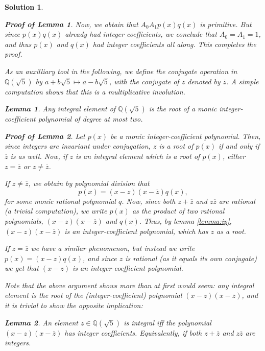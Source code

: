 \documentclass{article}
\newtheorem{lemma}{Lemma}
\theoremstyle{nonumberplain}
\newtheorem{sol}{Solution}
\newtheorem{lemmaproof}{Proof of Lemma}
\newcommand{\Q}{\mathbb{Q}}
\newcommand{\conj}[1]{\overline{#1}}
\begin{document}
\begin{sol}
\begin{lemmaproof}
Now, we obtain that $A_0 A_1 p(x) q(x)$ is primitive. But since $p(x) q(x)$ already had integer coefficients, we conclude that $A_0 = A_1 = 1$, and thus $p(x)$ and $q(x)$ had integer coefficients all along. This completes the proof.
\end{lemmaproof}

As an auxilliary tool in the following, we define the conjugate operation in $\Q(\sqrt5)$ by $a+b\sqrt5 \mapsto a-b\sqrt5$, with the conjugate of $z$ denoted by $\conj z$. A simple computation shows that this is a multiplicative involution.

\begin{lemma}
Any integral element of $\Q(\sqrt5)$ is the root of a monic integer-coefficient polynomial of degree at most two.
\end{lemma}

\begin{lemmaproof}
Let $p(x)$ be a monic integer-coefficient polynomial. Then, since integers are invariant under conjugation, $z$ is a root of $p(x)$ if and only if $\conj z$ is as well. Now, if $z$ is an integral element which is a root of $p(x)$, either $z = \conj z$ or $z \neq \conj z$.

If $z \neq \conj z$, we obtain by polynomial division that
\begin{equation}
p(x) = (x-z)(x-\conj z) q(x),
\end{equation}
for some monic rational polynomial $q$. Now, since both $z + \conj z$ and $z \conj z$ are rational (a trivial computation), we write $p(x)$ as the product of two rational polynomials, $(x-z)(x-\conj z)$ and $q(x)$. Thus, by lemma \ref{lemma:ip}, $(x-z)(x-\conj z)$ is an integer-coefficient polynomial, which has $z$ as a root.

If $z = \conj z$ we have a similar phenomenon, but instead we write $p(x) = (x-z) q(x)$, and since $z$ is rational (as it equals its own conjugate) we get that $(x-z)$ is an integer-coefficient polynomial.
\end{lemmaproof}

Note that the above argument shows more than at first would seem: any  integral element is the root of the (integer-coefficient) polynomial $(x-z)(x-\conj z)$, and it is trivial to show the opposite implication:

\begin{lemma}
An element $z \in \Q(\sqrt5)$ is integral iff the polynomial $(x-z)(x-\conj z)$ has integer coefficients. Equivalently, if both $z+\conj z$ and $z \conj z$ are integers.
\end{lemma}


\end{sol}
\end{document}
